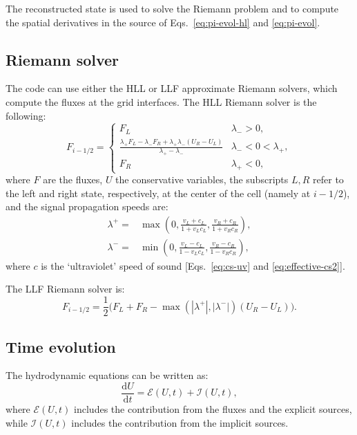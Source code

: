 \documentclass[aps,prd,twocolumn,a4paper,floatfix,nofootbib,superscriptaddress,nofootinbib]{revtex4}
\begin{document}
The reconstructed state is used to solve the Riemann problem and to compute the
spatial derivatives in the source of Eqs.~\eqref{eq:pi-evol-hl} and
\eqref{eq:pi-evol}.

\subsection{Riemann solver}
\label{ssec:riemann}

The code can use either the HLL or LLF approximate Riemann solvers,
which compute the fluxes at the grid interfaces.
The HLL Riemann solver is the following:
%
\begin{equation}
\label{eq:hll}
F_{i-1/2}=\begin{cases}F_L&\lambda_- > 0,\\
\frac{\lambda_+F_L - \lambda_-F_R +\lambda_+\lambda_-(U_R-U_L)}{\lambda_+ - \lambda_-}&\lambda_-<0<\lambda_+,\\
F_R&\lambda_+<0,\end{cases}
\end{equation}
where $F$ are the fluxes, $U$ the conservative variables, the subscripts
$L,R$ refer to the left and right state, respectively, at the center of the
cell (namely at $i-1/2$), and the signal propagation speeds are:
%
\begin{align}
\lambda^+={}&\max\left(0,\frac{v_L + c_L}{1 + v_Lc_L},\frac{v_R + c_R}{1 + v_Rc_R}\right),\\
\lambda^-={}&\min\left(0,\frac{v_L - c_L}{1 - v_Lc_L},\frac{v_R - c_R}{1 - v_Rc_R}\right),
\end{align}
%
where $c$ is the `ultraviolet' speed of sound [Eqs.~\eqref{eq:cs-uv} and \eqref{eq:effective-cs2}].

The LLF Riemann solver is:
%
\begin{equation}
F_{i-1/2}=\frac12\Big(F_L+F_R-\max(|\lambda^+|, |\lambda^-|)(U_R - U_L)\Big).
\end{equation}

\subsection{Time evolution}
\label{ssec:runge-kutta}

The hydrodynamic equations can be written as:
%
\begin{equation}
\label{eq:evolution}
\frac{\mathrm dU}{\mathrm dt}= \mathcal E(U,t) + \mathcal I(U,t),
\end{equation}
%
where $\mathcal E(U,t)$ includes the contribution from the fluxes and the explicit sources,
while $\mathcal I(U,t)$ includes the contribution from the implicit sources.
\end{document}
